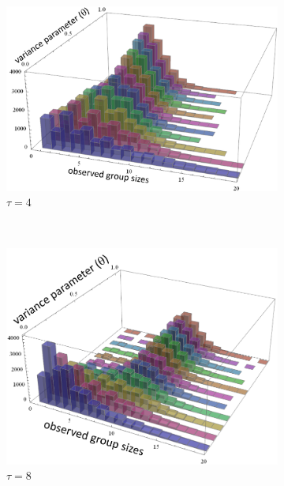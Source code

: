 \documentclass{svmult}  %
\begin{document}
\begin{figure}[!htb]
\begin{subfigure}{0.5\textwidth}
\centering\includegraphics[width=1.0\textwidth]{figures/collabratesweep4New.png}
\centering\caption{$\tau = 4$}\label{fig:collabsweep4}
\end{subfigure}~
\begin{subfigure}{0.5\textwidth}
\centering\includegraphics[width=1.0\textwidth]{figures/collabratesweep8New.png}
\centering\caption{$\tau = 8$}\label{fig:collabsweep8}
\end{subfigure}
\begin{subfigure}{0.5\textwidth}

\end{subfigure}
\end{figure}
\end{document}
